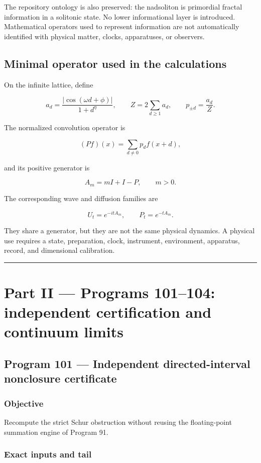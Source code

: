 \documentclass[11pt,a4paper,openany]{report}
\begin{document}
The repository ontology is also preserved: the nadsoliton is primordial fractal information in a solitonic state. No lower informational layer is introduced. Mathematical operators used to represent information are not automatically identified with physical matter, clocks, apparatuses, or observers.

\section{Minimal operator used in the calculations}

On the infinite lattice, define

\[
a_d=
\frac{|\cos(\omega d+\phi)|}{1+d^\eta},
\qquad
Z=2\sum_{d\ge1}a_d,
\qquad
p_{\pm d}=\frac{a_d}{Z}.
\]

The normalized convolution operator is

\[
(Pf)(x)=\sum_{d\ne0}p_d f(x+d),
\]

and its positive generator is

\[
A_m=mI+I-P,\qquad m>0.
\]

The corresponding wave and diffusion families are

\[
U_t=e^{-itA_m},
\qquad
P_t=e^{-tA_m}.
\]

They share a generator, but they are not the same physical dynamics. A physical use requires a state, preparation, clock, instrument, environment, apparatus, record, and dimensional calibration.

\par\medskip\hrule\medskip

\chapter{Part II --- Programs 101--104: independent certification and continuum limits}

\section{Program 101 --- Independent directed-interval nonclosure certificate}

\subsection{Objective}

Recompute the strict Schur obstruction without reusing the floating-point summation engine of Program 91.

\subsection{Exact inputs and tail}
\end{document}
